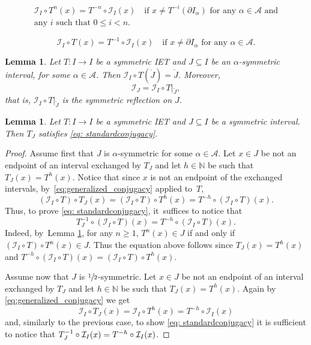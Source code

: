 \documentclass[10pt,a4paper]{article}
\theoremstyle{plain}
\newtheorem{lemma}[theorem]{Lemma}
\theoremstyle{definition}
\newcommand{\A}{\mathcal{A}}
\newcommand{\I}{\mathcal{I}}
\newcommand{\N}{\mathbb{N}}
\begin{document}
\begin{multline}
\label{eq:generalized_conjugacy}
\mathcal{I}_I\circ T^n(x)=T^{-n}\circ\mathcal{I}_I(x) \quad \text{if } x \neq T^{-i}(\partial I_\alpha) \text{ for any } \alpha \in \A \text{ and}\\ \text{any $i$ such that } 0 \leq i < n.
\end{multline}

\begin{equation}\label{eq: standardconjugacy}
\mathcal{I}_I\circ T(x)=T^{-1}\circ\mathcal{I}_I(x) \quad \text{if } x \neq \partial I_{\alpha} \text{ for any } \alpha \in \A.
\end{equation}

\begin{lemma}\label{lem: local_reflection}
Let $T : I \to I$ be a symmetric IET and $J \subseteq I$ be an $\alpha$-symmetric interval, for some $\alpha \in \A$. Then $\mathcal{I}_I\circ T(\mathring{J}) = \mathring{J}$. Moreover,
\[
\I_J = \mathcal{I}_I\circ T|_{\mathring{J}},
\]
that is, $\mathcal{I}_I\circ T|_{\mathring{J}}$ is the symmetric reflection on $J$.
\end{lemma}

\begin{lemma}
\label{lem:symmetric_condition}
Let $T : I \to I$ be a symmetric IET and $J \subseteq I$ be a symmetric interval. Then $T_J$ satisfies \eqref{eq: standardconjugacy}.\end{lemma}

\begin{proof}
Assume first that $J$ is $\alpha$-symmetric for some $\alpha\in\A$. Let $x\in J$ be not an endpoint of an interval exchanged by $T_J$ and let $h\in\N$ be such that $T_J(x)=T^{h}(x)$. Notice that since $x$ is not an endpoint of the exchanged intervals, by~\eqref{eq:generalized_conjugacy} applied to~$T$,\vspace*{-3pt}
\[
{(\I_I\circ T)\circ T_{J}(x)} = (\I_I\circ T) \circ T^h(x)=T^{-h}\circ (\I_I\circ T)(x).
\]
Thus, to prove \eqref{eq: standardconjugacy}, it~suffices to notice that\vspace*{-3pt}
\[
T_{J}^{-1}\circ (\I_I\circ T)(x) = T^{-h}\circ (\I_I\circ T)(x).
\]
Indeed, by~Lemma \ref{lem: local_reflection}, for any $n \geq 1$, $T^n(x) \in J$ if and only if $(\I_I\circ T) \circ T^n(x) \in J$. Thus the equation above follows since $T_J(x)=T^{h}(x)$ and $T^{-h}\circ (\I_I\circ T)(x) = (\I_I\circ T) \circ T^h(x)$.

Assume now that $J$ is $\sfrac{1}{2}$-symmetric. Let $x\in J$ be not an endpoint of an interval exchanged by $T_J$ and let $h\in\N$ be such that $T_J(x)=T^{h}(x)$. Again by \eqref{eq:generalized_conjugacy} we get\vspace*{-3pt}
\[
\I_I\circ T_{J}(x) = \I_I\circ T^h(x)=T^{-h}\circ \I_I(x)
\]
and, similarly to the previous case, to show \eqref{eq: standardconjugacy} it is sufficient to notice that $T_{J}^{-1}\circ\nobreak\I_I(x)=T^{-h}\circ\I_I(x)$.
\end{proof}
\end{document}
